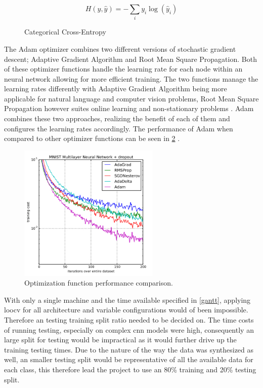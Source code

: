 \documentclass[12pt]{article}
\begin{document}
\begin{figure}[H]
\[ H(y, \hat{y}) = -\sum_{i} y_i \log(\hat{y}_i)  \]
\caption{Categorical Cross-Entropy}
\label{eq:cat-ce}
\end{figure}

The Adam optimizer combines two different versions of stochastic gradient descent; Adaptive Gradient Algorithm and Root Mean Square Propagation. Both of these optimizer functions handle the learning rate for each node within an neural network allowing for more efficient training. The two functions manage the learning rates differently with Adaptive Gradient Algorithm being more applicable for natural language and computer vision problems, Root Mean Square Propagation however suites online learning and non-stationary problems \cite{brownlee2021adam}. Adam combines these two approaches, realizing the benefit of each of them and configures the learning rates accordingly. The performance of Adam when compared to other optimizer functions can be seen in \ref{fig:adam} \cite{brownlee2021adam}.



\begin{figure}[H]
\includegraphics[width=0.6\textwidth]{adam}
\centering
\caption{Optimization function performance comparison.}
\label{fig:adam}
\end{figure}


With only a single machine and the time available specified in \ref{gantt}, applying \acrfull{loocv} for all architecture and variable configurations would of been impossible. Therefore an testing training split ratio needed to be decided on. The time costs of running testing, especially on complex \acrshort{cnn} models were high, consequently an large split for testing would be impractical as it would further drive up the training testing times. Due to the nature of the way the data was synthesized as well, an smaller testing split would be representative of all the available data for each class, this therefore lead the project to use an 80\% training and 20\% testing split. 
\end{document}
